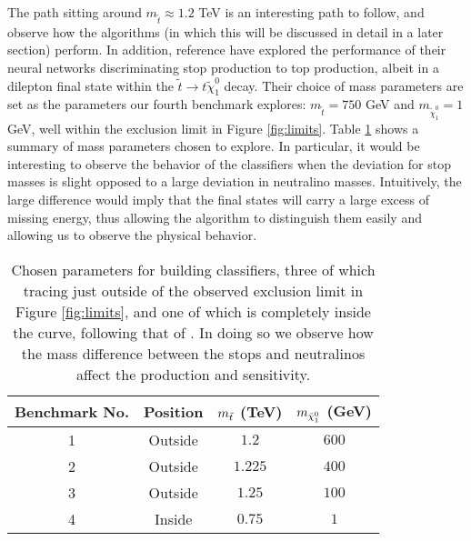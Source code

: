 The path sitting around $ m_{\tilde{t}} \approx 1.2$ TeV is an interesting path to follow, and observe how the algorithms (in which this will be discussed in detail in a later section) perform. In addition, reference \cite{roxlo2018opening} have explored the performance of their neural networks discriminating stop production to top production, albeit in a dilepton final state within the $\tilde{t} \rightarrow t \tilde{\chi}_1^0$ decay. Their choice of mass parameters are set as the parameters our fourth benchmark explores: $m_{\tilde{t}} =750$ GeV and $m_{\tilde{\chi}_1^0} = 1$ GeV, well within the exclusion limit in Figure \ref{fig:limits}. Table \ref{tab:benchmarks} shows a summary of mass parameters chosen to explore. In particular, it would be interesting to observe the behavior of the classifiers when the deviation for stop masses is slight opposed to a large deviation in neutralino masses. Intuitively, the large difference would imply that the final states will carry a large excess of missing energy, thus allowing the algorithm to distinguish them easily and allowing us to observe the physical behavior. 

\begin{table}[htbp]
    \centering
    \begin{tabular}{c|c|c|c} 
    \toprule
    Benchmark No. & Position & $m_{\Tilde{t}}$ (TeV) & $m_{\Tilde{\chi}_1^0}$ (GeV) \\
    \midrule
    \rowcolor{gray!6} 1 & Outside & $ 1.2 $ & $ 600 $ \\
    2 & Outside & $ 1.225 $ & $ 400 $ \\
    \rowcolor{gray!6} 3 & Outside & $ 1.25 $ & $ 100 $ \\
    4 & Inside & $ 0.75 $ & $ 1 $\\
    \bottomrule
    \end{tabular}
    \caption{Chosen parameters for building classifiers, three of which tracing just outside of the observed exclusion limit in Figure \ref{fig:limits}, and one of which is completely inside the curve, following that of \cite{roxlo2018opening}. In doing so we observe how the mass difference between the stops and neutralinos affect the production and sensitivity.} 
    \label{tab:benchmarks}
\end{table}

